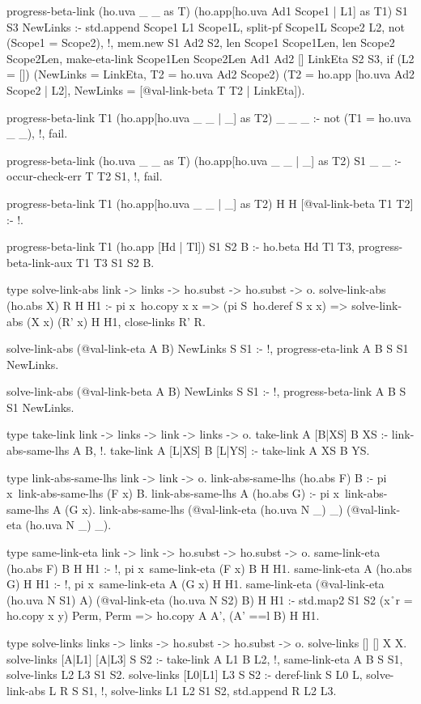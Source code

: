 \begin{elpicode}
  progress-beta-link (ho.uva _ _ as T) (ho.app[ho.uva Ad1 Scope1 | L1] as T1) S1 S3 NewLinks :-
    std.append Scope1 L1 Scope1L,
    split-pf Scope1L Scope2 L2,
    not (Scope1 = Scope2), !,
    mem.new S1 Ad2 S2,
    len Scope1 Scope1Len,
    len Scope2 Scope2Len,
    make-eta-link Scope1Len Scope2Len Ad1 Ad2 [] LinkEta S2 S3,
    if (L2 = []) (NewLinks = LinkEta, T2 = ho.uva Ad2 Scope2) 
      (T2 = ho.app [ho.uva Ad2 Scope2 | L2], 
      NewLinks = [@val-link-beta T T2 | LinkEta]).

  progress-beta-link T1 (ho.app[ho.uva _ _ | _] as T2) _ _ _ :- 
    not (T1 = ho.uva _ _), !, fail.

  progress-beta-link (ho.uva _ _ as T) (ho.app[ho.uva _ _ | _] as T2) S1 _ _ :- 
    occur-check-err T T2 S1, !, fail.

  progress-beta-link T1 (ho.app[ho.uva _ _ | _] as T2) H H [@val-link-beta T1 T2] :- !.

  progress-beta-link T1 (ho.app [Hd | Tl]) S1 S2 B :-
    ho.beta Hd Tl T3, 
    progress-beta-link-aux T1 T3 S1 S2 B.

  type solve-link-abs link -> links -> ho.subst -> ho.subst -> o.
  solve-link-abs (ho.abs X) R H H1 :- 
    pi x\ ho.copy x x => (pi S\ ho.deref S x x) => 
      solve-link-abs (X x) (R' x) H H1,
    close-links R' R.

  solve-link-abs (@val-link-eta A B) NewLinks S S1 :- !,
    progress-eta-link A B S S1 NewLinks.

  solve-link-abs (@val-link-beta A B) NewLinks S S1 :- !,
    progress-beta-link A B S S1 NewLinks.

  type take-link link -> links -> link -> links -> o.
  take-link A [B|XS] B XS :- link-abs-same-lhs A B, !.
  take-link A [L|XS] B [L|YS] :- take-link A XS B YS.

  type link-abs-same-lhs link -> link -> o.
  link-abs-same-lhs (ho.abs F) B :- 
    pi x\ link-abs-same-lhs (F x) B.
  link-abs-same-lhs A (ho.abs G) :- 
    pi x\ link-abs-same-lhs A (G x).
  link-abs-same-lhs (@val-link-eta (ho.uva N _) _) (@val-link-eta (ho.uva N _) _).

  type same-link-eta link -> link -> ho.subst -> ho.subst -> o.
  same-link-eta (ho.abs F) B H H1 :- !, pi x\ same-link-eta (F x) B H H1.
  same-link-eta A (ho.abs G) H H1 :- !, pi x\ same-link-eta A (G x) H H1.
  same-link-eta (@val-link-eta (ho.uva N S1) A)
                (@val-link-eta (ho.uva N S2) B) H H1 :-
    std.map2 S1 S2 (x\y\r\ r = ho.copy x y) Perm,
    Perm => ho.copy A A',
    (A' ==l B) H H1.

  type solve-links links -> links -> ho.subst -> ho.subst -> o.
  solve-links [] [] X X.
  solve-links [A|L1] [A|L3] S S2 :- take-link A L1 B L2, !,
    same-link-eta A B S S1, 
    solve-links L2 L3 S1 S2.
  solve-links [L0|L1] L3 S S2 :- deref-link S L0 L,
    solve-link-abs L R S S1, !,
    solve-links L1 L2 S1 S2, std.append R L2 L3.
\end{elpicode}

